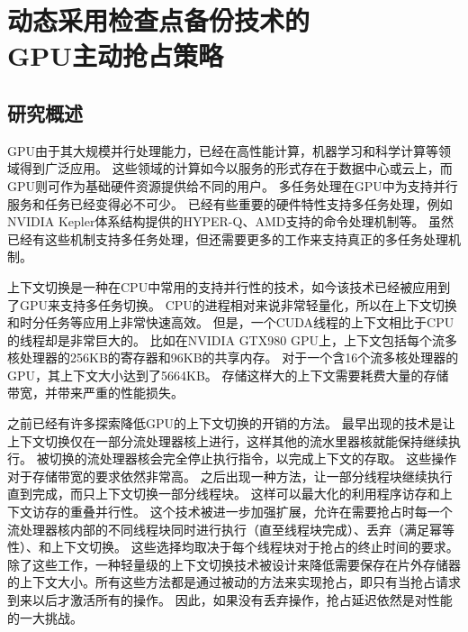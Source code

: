\chapter{动态采用检查点备份技术的\\GPU主动抢占策略}
\label{chap:PEP}

\section{研究概述}

GPU由于其大规模并行处理能力，已经在高性能计算，机器学习和科学计算等领域得到广泛应用。
这些领域的计算如今以服务的形式存在于数据中心或云上，而GPU则可作为基础硬件资源提供给不同的用户。
多任务处理在GPU中为支持并行服务和任务已经变得必不可少。
已经有些重要的硬件特性支持多任务处理，例如NVIDIA Kepler体系结构提供的HYPER-Q、AMD支持的命令处理机制等。
虽然已经有这些机制支持多任务处理，但还需要更多的工作来支持真正的多任务处理机制。

上下文切换是一种在CPU中常用的支持并行性的技术，如今该技术已经被应用到了GPU来支持多任务切换。
CPU的进程相对来说非常轻量化，所以在上下文切换和时分任务等应用上非常快速高效。
但是，一个CUDA线程的上下文相比于CPU的线程却是非常巨大的。
比如在NVIDIA GTX980 GPU上，上下文包括每个流多核处理器的256KB的寄存器和96KB的共享内存。
对于一个含16个流多核处理器的GPU，其上下文大小达到了5664KB。
存储这样大的上下文需要耗费大量的存储带宽，并带来严重的性能损失。

之前已经有许多探索降低GPU的上下文切换的开销的方法。
最早出现的技术是让上下文切换仅在一部分流处理器核上进行，这样其他的流水里器核就能保持继续执行。
被切换的流处理器核会完全停止执行指令，以完成上下文的存取。
这些操作对于存储带宽的要求依然非常高。
之后出现一种方法，让一部分线程块继续执行直到完成，而只上下文切换一部分线程块。
这样可以最大化的利用程序访存和上下文访存的重叠并行性。
这个技术被进一步加强扩展，允许在需要抢占时每一个流处理器核内部的不同线程块同时进行执行（直至线程块完成）、丢弃（满足幂等性）、和上下文切换。
这些选择均取决于每个线程块对于抢占的终止时间的要求。
除了这些工作，一种轻量级的上下文切换技术被设计来降低需要保存在片外存储器的上下文大小。所有这些方法都是通过被动的方法来实现抢占，即只有当抢占请求到来以后才激活所有的操作。
因此，如果没有丢弃操作，抢占延迟依然是对性能的一大挑战。

